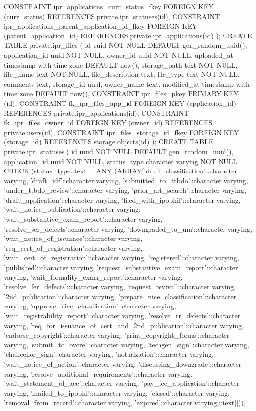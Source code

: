   CONSTRAINT ipr_applications_curr_status_fkey FOREIGN KEY (curr_status) REFERENCES private.ipr_statuses(id),
  CONSTRAINT ipr_applications_parent_application_id_fkey FOREIGN KEY (parent_application_id) REFERENCES private.ipr_applications(id)
);
CREATE TABLE private.ipr_files (
  id uuid NOT NULL DEFAULT gen_random_uuid(),
  application_id uuid NOT NULL,
  owner_id uuid NOT NULL,
  uploaded_at timestamp with time zone DEFAULT now(),
  storage_path text NOT NULL,
  file_name text NOT NULL,
  file_description text,
  file_type text NOT NULL,
  comments text,
  storage_id uuid,
  owner_name text,
  modified_at timestamp with time zone DEFAULT now(),
  CONSTRAINT ipr_files_pkey PRIMARY KEY (id),
  CONSTRAINT fk_ipr_files_app_id FOREIGN KEY (application_id) REFERENCES private.ipr_applications(id),
  CONSTRAINT fk_ipr_files_owner_id FOREIGN KEY (owner_id) REFERENCES private.users(id),
  CONSTRAINT ipr_files_storage_id_fkey FOREIGN KEY (storage_id) REFERENCES storage.objects(id)
);
CREATE TABLE private.ipr_statuses (
  id uuid NOT NULL DEFAULT gen_random_uuid(),
  application_id uuid NOT NULL,
  status_type character varying NOT NULL CHECK (status_type::text = ANY (ARRAY['draft_classification'::character varying, 'draft_idf'::character varying, 'submitted_to_ttbdo'::character varying, 'under_ttbdo_review'::character varying, 'prior_art_search'::character varying, 'draft_application'::character varying, 'filed_with_ipophil'::character varying, 'wait_notice_publication'::character varying, 'wait_substantive_exam_report'::character varying, 'resolve_ser_defects'::character varying, 'downgraded_to_um'::character varying, 'wait_notice_of_issuance'::character varying, 'req_cert_of_registration'::character varying, 'wait_cert_of_registration'::character varying, 'registered'::character varying, 'published'::character varying, 'request_substantive_exam_report'::character varying, 'wait_formality_exam_report'::character varying, 'resolve_fer_defects'::character varying, 'request_revival'::character varying, '2nd_publication'::character varying, 'prepare_nice_classification'::character varying, 'approve_nice_classification'::character varying, 'wait_registrability_report'::character varying, 'resolve_rr_defects'::character varying, 'req_for_issuance_of_cert_and_2nd_publication'::character varying, 'endorse_copyright'::character varying, 'print_copyright_forms'::character varying, 'submit_to_ovcre'::character varying, 'techgen_sign'::character varying, 'chancellor_sign'::character varying, 'notarization'::character varying, 'wait_notice_of_action'::character varying, 'discussing_downgrade'::character varying, 'resolve_additional_requirements'::character varying, 'wait_statement_of_acc'::character varying, 'pay_fee_application'::character varying, 'mailed_to_ipophl'::character varying, 'closed'::character varying, 'removal_from_record'::character varying, 'expired'::character varying]::text[])),
